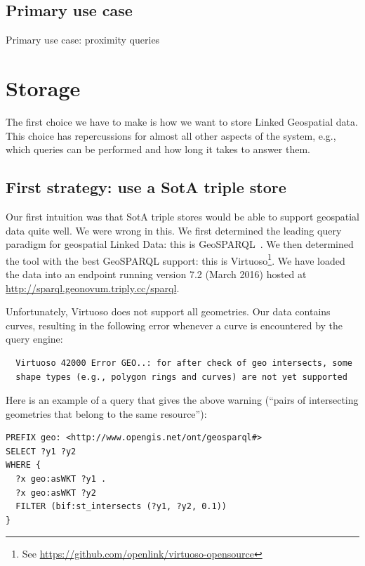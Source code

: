 \documentclass[a4paper]{scrartcl}
\begin{document}
\subsection{Primary use case}
\label{sec:use_case}

Primary use case: proximity queries


\section{Storage}
\label{sec:storage}

The first choice we have to make is how we want to store Linked
Geospatial data.  This choice has repercussions for almost all other
aspects of the system, e.g., which queries can be performed and how
long it takes to answer them.


\subsection{First strategy: use a SotA triple store}

Our first intuition was that SotA triple stores would be able to
support geospatial data quite well.  We were wrong in this.  We first
determined the leading query paradigm for geospatial Linked Data: this
is GeoSPARQL~\cite{Battle2011}.  We then determined the tool with the
best GeoSPARQL support: this is Virtuoso\footnote{See
  \url{https://github.com/openlink/virtuoso-opensource}}.  We have
loaded the data into an endpoint running version 7.2 (March 2016)
hosted at \url{http://sparql.geonovum.triply.cc/sparql}.

Unfortunately, Virtuoso does not support all geometries.  Our data
contains curves, resulting in the following error whenever a curve is
encountered by the query engine:

\begin{verbatim}
  Virtuoso 42000 Error GEO..: for after check of geo intersects, some
  shape types (e.g., polygon rings and curves) are not yet supported
\end{verbatim}

Here is an example of a query that gives the above warning (``pairs of
intersecting geometries that belong to the same resource''):

\begin{verbatim}
PREFIX geo: <http://www.opengis.net/ont/geosparql#>
SELECT ?y1 ?y2
WHERE {
  ?x geo:asWKT ?y1 .
  ?x geo:asWKT ?y2
  FILTER (bif:st_intersects (?y1, ?y2, 0.1))
}
\end{verbatim}
\end{document}
